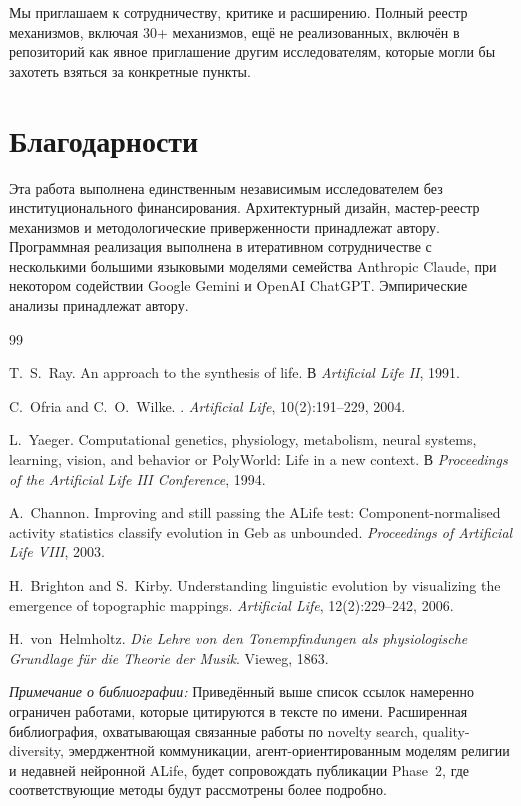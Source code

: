\documentclass[11pt,a4paper]{article}
\begin{document}
Мы приглашаем к сотрудничеству, критике и расширению. Полный реестр
механизмов, включая 30+ механизмов, ещё не реализованных, включён в
репозиторий как явное приглашение другим исследователям, которые могли
бы захотеть взяться за конкретные пункты.

\section*{Благодарности}

Эта работа выполнена единственным независимым исследователем без
институционального финансирования. Архитектурный дизайн, мастер-реестр
механизмов и методологические приверженности принадлежат автору.
Программная реализация выполнена в итеративном сотрудничестве с
несколькими большими языковыми моделями семейства Anthropic Claude,
при некотором содействии Google Gemini и OpenAI ChatGPT. Эмпирические
анализы принадлежат автору.

\begin{thebibliography}{99}

T.~S.~Ray.
\newblock An approach to the synthesis of life.
\newblock В \emph{Artificial Life II}, 1991.

C.~Ofria and C.~O.~Wilke.
.
\newblock \emph{Artificial Life}, 10(2):191--229, 2004.

L.~Yaeger.
\newblock Computational genetics, physiology, metabolism, neural systems,
         learning, vision, and behavior or PolyWorld: Life in a new context.
\newblock В \emph{Proceedings of the Artificial Life III Conference}, 1994.

A.~Channon.
\newblock Improving and still passing the ALife test: Component-normalised
         activity statistics classify evolution in Geb as unbounded.
\newblock \emph{Proceedings of Artificial Life VIII}, 2003.

H.~Brighton and S.~Kirby.
\newblock Understanding linguistic evolution by visualizing the emergence
         of topographic mappings.
\newblock \emph{Artificial Life}, 12(2):229--242, 2006.

H.~von~Helmholtz.
\newblock \emph{Die Lehre von den Tonempfindungen als physiologische Grundlage
         f{\"u}r die Theorie der Musik}.
\newblock Vieweg, 1863.

\end{thebibliography}

\noindent\textit{Примечание о библиографии:} Приведённый выше список
ссылок намеренно ограничен работами, которые цитируются в тексте по
имени. Расширенная библиография, охватывающая связанные работы по
novelty search, quality-diversity, эмерджентной коммуникации,
агент-ориентированным моделям религии и недавней нейронной ALife,
будет сопровождать публикации Phase~2, где соответствующие методы
будут рассмотрены более подробно.
\end{document}
